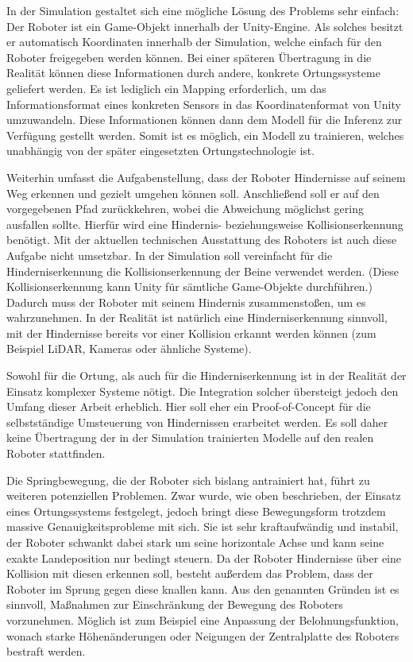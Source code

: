 In der Simulation gestaltet sich eine mögliche Lösung des Problems sehr einfach: Der Roboter ist ein Game-Objekt innerhalb der Unity-Engine.
Als solches besitzt er automatisch Koordinaten innerhalb der Simulation, welche einfach für den Roboter freigegeben werden können.
Bei einer späteren Übertragung in die Realität können diese Informationen durch andere, konkrete Ortungssysteme geliefert werden.
Es ist lediglich ein Mapping erforderlich, um das Informationsformat eines konkreten Sensors in das Koordinatenformat von Unity umzuwandeln.
Diese Informationen können dann dem Modell für die Inferenz zur Verfügung gestellt werden.
Somit ist es möglich, ein Modell zu trainieren, welches unabhängig von der später eingesetzten Ortungstechnologie ist.

Weiterhin umfasst die Aufgabenstellung, dass der Roboter Hindernisse auf seinem Weg erkennen und gezielt umgehen können soll.
Anschließend soll er auf den vorgegebenen Pfad zurückkehren, wobei die Abweichung möglichst gering ausfallen sollte.
Hierfür wird eine Hindernis- beziehungsweise Kollisionserkennung benötigt.
Mit der aktuellen technischen Ausstattung des Roboters ist auch diese Aufgabe nicht umsetzbar.
In der Simulation soll vereinfacht für die Hinderniserkennung die Kollisionserkennung der Beine verwendet werden.
(Diese Kollisionserkennung kann Unity für sämtliche Game-Objekte durchführen.)
Dadurch muss der Roboter mit seinem Hindernis zusammenstoßen, um es wahrzunehmen.
In der Realität ist natürlich eine Hinderniserkennung sinnvoll, mit der Hindernisse bereits vor einer Kollision erkannt werden können (zum Beispiel LiDAR, Kameras oder ähnliche Systeme).

Sowohl für die Ortung, als auch für die Hinderniserkennung ist in der Realität der Einsatz komplexer Systeme nötigt.
Die Integration solcher übersteigt jedoch den Umfang dieser Arbeit erheblich.
Hier soll eher ein Proof-of-Concept für die selbstständige Umsteuerung von Hindernissen erarbeitet werden.
Es soll daher keine Übertragung der in der Simulation trainierten Modelle auf den realen Roboter stattfinden.

Die Springbewegung, die der Roboter sich bislang antrainiert hat, führt zu weiteren potenziellen Problemen.
Zwar wurde, wie oben beschrieben, der Einsatz eines Ortungssystems festgelegt, jedoch bringt diese Bewegungsform trotzdem massive Genauigkeitsprobleme mit sich. 
Sie ist sehr kraftaufwändig und instabil, der Roboter schwankt dabei stark um seine horizontale Achse und kann seine exakte Landeposition nur bedingt steuern.
Da der Roboter Hindernisse über eine Kollision mit diesen erkennen soll, besteht außerdem das Problem, dass der Roboter im Sprung gegen diese knallen kann.
Aus den genannten Gründen ist es sinnvoll, Maßnahmen zur Einschränkung der Bewegung des Roboters vorzunehmen.
Möglich ist zum Beispiel eine Anpassung der Belohnungsfunktion, wonach starke Höhenänderungen oder Neigungen der Zentralplatte des Roboters bestraft werden.

